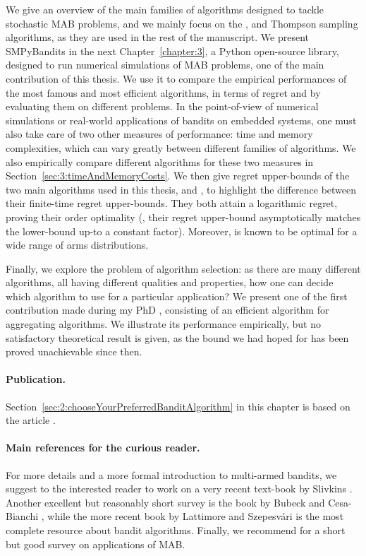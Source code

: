 We give an overview of the main families of algorithms designed to tackle stochastic MAB problems, and we mainly focus on the \UCB, \klUCB{} and Thompson sampling algorithms, as they are used in the rest of the manuscript.
We present SMPyBandits in the next Chapter~\ref{chapter:3}, a Python open-source library, designed to run numerical simulations of MAB problems, one of the main contribution of this thesis. We use it to compare the empirical performances of the most famous and most efficient algorithms, in terms of regret and by evaluating them on different problems.
%
In the point-of-view of numerical simulations or real-world applications of bandits on embedded systems, one must also take care of two other measures of performance: time and memory complexities, which can vary greatly between different families of algorithms.
We also empirically compare different algorithms for these two measures in Section~\ref{sec:3:timeAndMemoryCosts}.
%
We then give regret upper-bounds of the two main algorithms used in this thesis, \UCB{} and \klUCB, to highlight the difference between their finite-time regret upper-bounds. They both attain a logarithmic regret, proving their order optimality (\ie, their regret upper-bound asymptotically matches the lower-bound up-to a constant factor). Moreover, \klUCB{} is known to be optimal for a wide range of arms distributions.

Finally, we explore the problem of algorithm selection: as there are many different algorithms, all having different qualities and properties, how one can decide which algorithm to use for a particular application?
We present one of the first contribution made during my PhD \cite{Besson2018WCNC}, consisting of an efficient algorithm for aggregating algorithms.
We illustrate its performance empirically, but no satisfactory theoretical result is given, as the bound we had hoped for has been proved unachievable since then.


\paragraph{Publication.}
%
Section~\ref{sec:2:chooseYourPreferredBanditAlgorithm} in this chapter is based on the article \cite{Besson2018WCNC}.


\paragraph{Main references for the curious reader.}
%
For more details and a more formal introduction to multi-armed bandits, we suggest to the interested reader to work on a very recent text-book by Slivkins \cite{Slivkins2019}.
Another excellent but reasonably short survey is the book by Bubeck and Cesa-Bianchi \cite{Bubeck12}, while the more recent book by Lattimore and Szepesv{\'a}ri \cite{LattimoreBanditAlgorithmsBook} is the most complete resource about bandit algorithms.
Finally, we recommend \cite{bouneffouf2019survey} for a short but good survey on applications of MAB.

